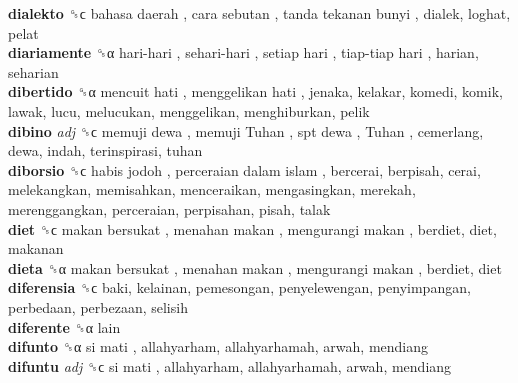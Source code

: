 \textbf{dialekto} ␝ϲ   bahasa daerah ,  cara sebutan ,  tanda tekanan bunyi , dialek, loghat, pelat  \\
\textbf{diariamente} ␝α   hari-hari ,  sehari-hari ,  setiap hari ,  tiap-tiap hari , harian, seharian  \\
\textbf{dibertido} ␝α   mencuit hati ,  menggelikan hati , jenaka, kelakar, komedi, komik, lawak, lucu, melucukan, menggelikan, menghiburkan, pelik  \\
\textbf{dibino} \emph{adj}  ␝ϲ   memuji dewa ,  memuji Tuhan ,  spt dewa ,  Tuhan , cemerlang, dewa, indah, terinspirasi, tuhan  \\
\textbf{diborsio} ␝ϲ   habis jodoh ,  perceraian dalam islam , bercerai, berpisah, cerai, melekangkan, memisahkan, menceraikan, mengasingkan, merekah, merenggangkan, perceraian, perpisahan, pisah, talak  \\
\textbf{diet} ␝ϲ   makan bersukat ,  menahan makan ,  mengurangi makan , berdiet, diet, makanan  \\
\textbf{dieta} ␝α   makan bersukat ,  menahan makan ,  mengurangi makan , berdiet, diet  \\
\textbf{diferensia} ␝ϲ  baki, kelainan, pemesongan, penyelewengan, penyimpangan, perbedaan, perbezaan, selisih  \\
\textbf{diferente} ␝α  lain  \\
\textbf{difunto} ␝α   si mati , allahyarham, allahyarhamah, arwah, mendiang  \\
\textbf{difuntu} \emph{adj}  ␝ϲ   si mati , allahyarham, allahyarhamah, arwah, mendiang  \\
